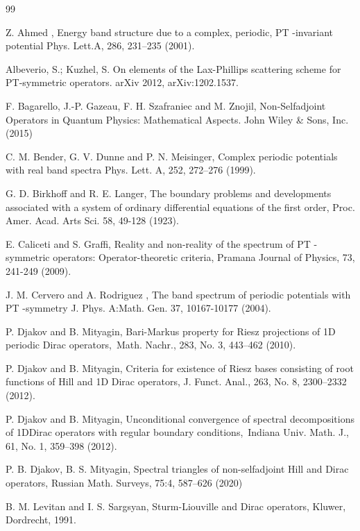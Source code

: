 \documentclass{article}%
\begin{document}
\begin{thebibliography}{99}                                                                                               %


\bibitem {}Z. Ahmed , Energy band structure due to a complex, periodic, PT
-invariant potential Phys. Lett.A, 286, 231--235 (2001).

\bibitem {}Albeverio, S.; Kuzhel, S. On elements of the Lax-Phillips
scattering scheme for PT-symmetric operators. arXiv 2012, arXiv:1202.1537.

\bibitem {}F. Bagarello, J.-P. Gazeau, F. H. Szafraniec and M. Znojil,
Non-Selfadjoint Operators in Quantum Physics: Mathematical Aspects. John Wiley
\& Sons, Inc. (2015)

\bibitem {}C. M. Bender, G. V. Dunne and P. N. Meisinger, Complex periodic
potentials with real band spectra Phys. Lett. A, 252, 272--276 (1999).

\bibitem {}G. D. Birkhoff and R. E. Langer, The boundary problems and
developments associated with a system of ordinary differential equations of
the first order, Proc. Amer. Acad. Arts Sci. 58, 49-128 (1923).

\bibitem {}E. Caliceti and S. Graffi, Reality and non-reality of the spectrum
of PT -symmetric operators: Operator-theoretic criteria, Pramana Journal of
Physics, 73, 241-249 (2009).

\bibitem {}J. M. Cervero and A. Rodriguez , The band spectrum of periodic
potentials with PT -symmetry J. Phys. A:Math. Gen. 37, 10167-10177 (2004).

\bibitem {}P. Djakov and B. Mityagin, Bari-Markus property for Riesz
projections of 1D periodic Dirac operators,\ Math. Nachr., 283, No. 3,
443--462 (2010).

\bibitem {}P. Djakov and B. Mityagin, Criteria for existence of Riesz bases
consisting of root functions of Hill and 1D Dirac operators, J. Funct. Anal.,
263, No. 8, 2300--2332 (2012).

\bibitem {}P. Djakov and B. Mityagin, Unconditional convergence of spectral
decompositions of 1DDirac operators with regular boundary conditions,\ Indiana
Univ. Math. J., 61, No. 1, 359--398 (2012).

\bibitem {}P. B. Djakov, B. S. Mityagin, Spectral triangles of non-selfadjoint
Hill and Dirac operators, Russian Math. Surveys, 75:4, 587--626 (2020)

\bibitem {}B. M. Levitan and I. S. Sargsyan, Sturm-Liouville and Dirac
operators, Kluwer, Dordrecht, 1991.


\end{thebibliography}
\end{document}
